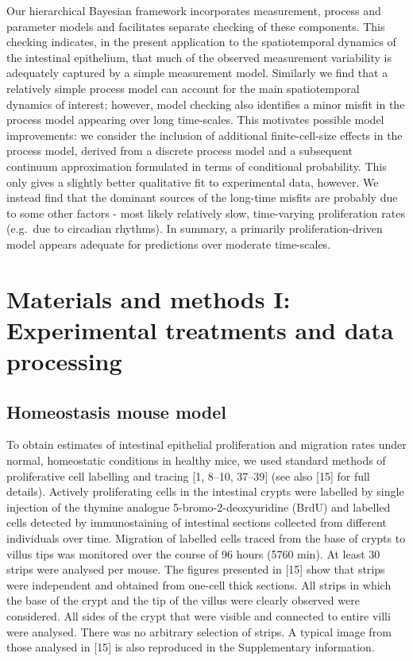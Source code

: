 \documentclass[10pt,letterpaper]{article}
\begin{document}
Our hierarchical Bayesian framework incorporates measurement, process
and parameter models and facilitates separate checking of these
components. This checking indicates, in the present application to the
spatiotemporal dynamics of the intestinal epithelium, that much of the
observed measurement variability is adequately captured by a simple
measurement model. Similarly we find that a relatively simple process
model can account for the main spatiotemporal dynamics of interest;
however, model checking also identifies a minor misfit in the process
model appearing over long time-scales. This motivates possible model
improvements: we consider the inclusion of additional finite-cell-size
effects in the process model, derived from a discrete process model and
a subsequent continuum approximation formulated in terms of conditional
probability. This only gives a slightly better qualitative fit to
experimental data, however. We instead find that the dominant sources of
the long-time misfits are probably due to some other factors - most
likely relatively slow, time-varying proliferation rates (e.g.~due to
circadian rhythms). In summary, a primarily proliferation-driven model
appears adequate for predictions over moderate time-scales.

\section{Materials and methods I: Experimental treatments and data
processing}\label{materials-and-methods-i-experimental-treatments-and-data-processing}

\subsection{Homeostasis mouse model}\label{homeostasis-mouse-model}

To obtain estimates of intestinal epithelial proliferation and migration
rates under normal, homeostatic conditions in healthy mice, we used
standard methods of proliferative cell labelling and tracing {[}1,
8--10, 37--39{]} (see also {[}15{]} for full details). Actively
proliferating cells in the intestinal crypts were labelled by single
injection of the thymine analogue 5-bromo-2-deoxyuridine (BrdU) and
labelled cells detected by immunostaining of intestinal sections
collected from different individuals over time. Migration of labelled
cells traced from the base of crypts to villus tips was monitored over
the course of 96 hours (5760 min). At least 30 strips were analysed per
mouse. The figures presented in {[}15{]} show that strips were
independent and obtained from one-cell thick sections. All strips in
which the base of the crypt and the tip of the villus were clearly
observed were considered. All sides of the crypt that were visible and
connected to entire villi were analysed. There was no arbitrary
selection of strips. A typical image from those analysed in {[}15{]} is
also reproduced in the Supplementary information.
\end{document}
